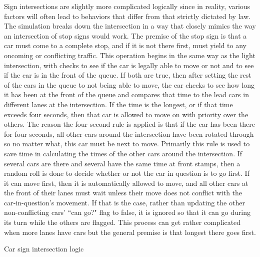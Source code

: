 \newpage
Sign intersections are slightly more complicated logically since in reality, various factors will often lead to behaviors that differ from that strictly dictated by law.  The simulation breaks down the intersection in a way that closely mimics the way an intersection of stop signs would work.  The premise of the stop sign is that a car must come to a complete stop, and if it is not there first, must yield to any oncoming or conflicting traffic.  This operation begins in the same way as the light intersection, with checks to see if the car is legally able to move or not and to see if the car is in the front of the queue.  If both are true, then after setting the rest of the cars in the queue to not being able to move, the car checks to see how long it has been at the front of the queue and compares that time to the lead cars in different lanes at the intersection.  If the time is the longest, or if that time exceeds four seconds, then that car is allowed to move on with priority over the others.  The reason the four-second rule is applied is that if the car has been there for four seconds, all other cars around the intersection have been rotated through so no matter what, this car must be next to move.  Primarily this rule is used to save time in calculating the times of the other cars around the intersection.  If several cars are there and several have the same time at front stamps, then a random roll is done to decide whether or not the car in question is to go first.  If it can move first, then it is automatically allowed to move, and all other cars at the front of their lanes must wait unless their move does not conflict with the car-in-question's movement.  If that is the case, rather than updating the other non-conflicting cars'  ``can go?" flag to false, it is ignored so that it can go during its turn while the others are flagged.  This process can get rather complicated when more lanes have cars but the general premise is that longest there goes first.

\begin{algorithm}[htpb]
 \SetAlgoLined

 \caption{Car sign intersection logic}
\label{Stop Sign Intersection}
\end{algorithm}

